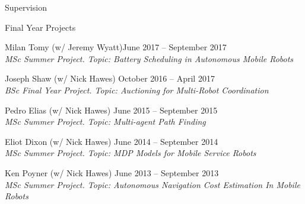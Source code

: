 \begin{rSection}{Supervision}
\begin{rSubsection}{Final Year Projects}{}{}{}
\item   Milan Tomy (w/ Jeremy Wyatt)\hfill June 2017 -- September 2017\\
\textit{MSc Summer Project. Topic: Battery Scheduling in Autonomous Mobile Robots}

\item   Joseph Shaw (w/ Nick Hawes) \hfill October 2016 -- April 2017\\
\textit{BSc Final Year Project. Topic: Auctioning for Multi-Robot Coordination}

\item  Pedro Elias (w/ Nick Hawes)  \hfill June 2015 -- September 2015\\
\textit{MSc Summer Project. Topic: Multi-agent Path Finding}

\item  Eliot Dixon  (w/ Nick Hawes) \hfill June 2014 -- September 2014\\
\textit{MSc Summer Project. Topic: MDP Models for Mobile Service Robots}

\item  Ken Poyner (w/ Nick Hawes) \hfill June 	2013 -- September 2013\\
\textit{MSc Summer Project. Topic: Autonomous Navigation Cost Estimation In Mobile Robots}

\end{rSubsection}

\end{rSection}

